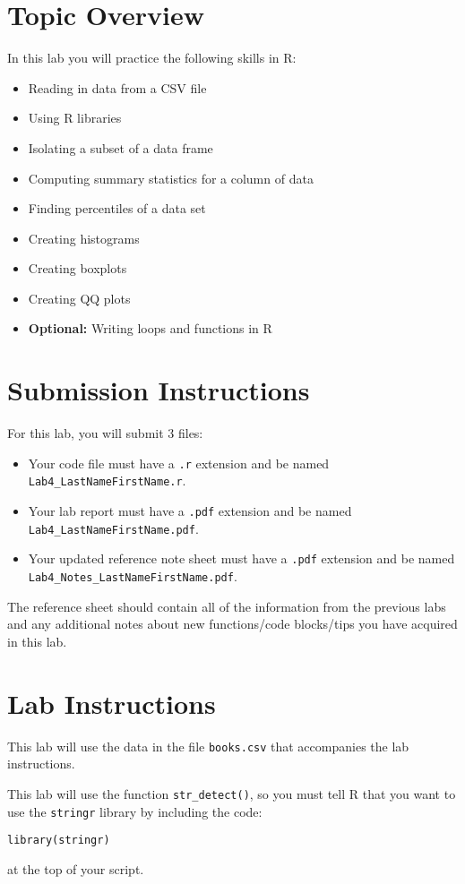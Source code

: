 \documentclass{article}
\begin{document}
\section*{Topic Overview}
In this lab you will practice the following skills in R:
\begin{itemize}
    \item Reading in data from a CSV file
    \item Using R libraries
    \item Isolating a subset of a data frame
    \item Computing summary statistics for a column of data
    \item Finding percentiles of a data set
    \item Creating histograms
    \item Creating boxplots
    \item Creating QQ plots
    \item \textbf{Optional:} Writing loops and functions in R
\end{itemize}

\section*{Submission Instructions}
For this lab, you will submit 3 files:
\begin{itemize}
    \item Your code file must have a \texttt{.r} extension and be named \texttt{Lab4\_LastNameFirstName.r}.
    \item Your lab report must have a \texttt{.pdf} extension and be named \texttt{Lab4\_LastNameFirstName.pdf}.
    \item Your updated reference note sheet must have a \texttt{.pdf} extension and be named \texttt{Lab4\_Notes\_LastNameFirstName.pdf}.
\end{itemize}
The reference sheet should contain all of the information from the previous labs and any additional notes about new functions/code blocks/tips you have acquired in this lab.

\section*{Lab Instructions}
This lab will use the data in the file \texttt{books.csv} that accompanies the lab instructions.

This lab will use the function \texttt{str\_detect()}, so you must tell R that you want to use the \texttt{stringr} library by including the code:
\begin{verbatim}
library(stringr)
\end{verbatim}
at the top of your script.
\end{document}
